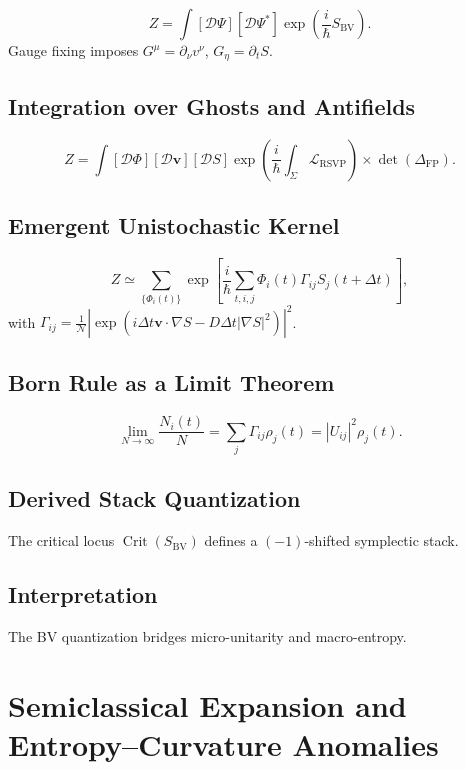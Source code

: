 \documentclass[12pt]{article}
\begin{document}
\[
Z = \int [\mathcal{D}\Psi][\mathcal{D}\Psi^*] \exp\left( \frac{i}{\hbar} S_{\mathrm{BV}} \right).
\]
Gauge fixing imposes \(G^\mu = \partial_\nu v^\nu\), \(G_\eta = \partial_t S\).

\subsection{Integration over Ghosts and Antifields}

\[
Z = \int [\mathcal{D}\Phi][\mathcal{D}\mathbf{v}][\mathcal{D}S] \exp\left( \frac{i}{\hbar} \int_\Sigma \mathcal{L}_{\mathrm{RSVP}} \right) \times \det(\Delta_{\mathrm{FP}}).
\]

\subsection{Emergent Unistochastic Kernel}

\[
Z \simeq \sum_{\{\Phi_i(t)\}} \exp\left[ \frac{i}{\hbar} \sum_{t,i,j} \Phi_i(t) \Gamma_{ij} S_j(t + \Delta t) \right],
\]
with \(\Gamma_{ij} = \frac{1}{\mathcal{N}} \left| \exp\left( i \Delta t \mathbf{v} \cdot \nabla S - D \Delta t |\nabla S|^2 \right) \right|^2\).

\subsection{Born Rule as a Limit Theorem}

\[
\lim_{N \to \infty} \frac{N_i(t)}{N} = \sum_j \Gamma_{ij} \rho_j(t) = |U_{ij}|^2 \rho_j(t).
\]

\subsection{Derived Stack Quantization}

The critical locus \(\operatorname{Crit}(S_{\mathrm{BV}})\) defines a \((-1)\)-shifted symplectic stack.

\subsection{Interpretation}

The BV quantization bridges micro-unitarity and macro-entropy.

\section{Semiclassical Expansion and Entropy–Curvature Anomalies}
\label{app:semiclassical}
\end{document}
